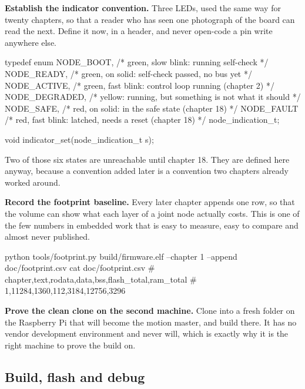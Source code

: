 \begin{steps}
\item \textbf{Establish the indicator convention.} Three LEDs, used the same way
for twenty chapters, so that a reader who has seen one photograph of the board
can read the next. Define it now, in a header, and never open-code a pin write
anywhere else.
\begin{ccode}
typedef enum {
    NODE_BOOT,      /* green, slow blink: running self-check                */
    NODE_READY,     /* green, on solid: self-check passed, no bus yet       */
    NODE_ACTIVE,    /* green, fast blink: control loop running (chapter 2)  */
    NODE_DEGRADED,  /* yellow: running, but something is not what it should */
    NODE_SAFE,      /* red, on solid: in the safe state (chapter 18)        */
    NODE_FAULT      /* red, fast blink: latched, needs a reset (chapter 18) */
} node_indication_t;

void indicator_set(node_indication_t s);
\end{ccode}
Two of those six states are unreachable until chapter 18. They are defined here
anyway, because a convention added later is a convention two chapters already
worked around.

\item \textbf{Record the footprint baseline.} Every later chapter appends one
row, so that the volume can show what each layer of a joint node actually costs.
This is one of the few numbers in embedded work that is easy to measure, easy to
compare and almost never published.
\begin{shellcode}
python tools/footprint.py build/firmware.elf --chapter 1 --append doc/footprint.csv
cat doc/footprint.csv
# chapter,text,rodata,data,bss,flash_total,ram_total
# 1,11284,1360,112,3184,12756,3296
\end{shellcode}

\item \textbf{Prove the clean clone on the second machine.} Clone into a fresh
folder on the Raspberry Pi that will become the motion master, and build there.
It has no vendor development environment and never will, which is exactly why it
is the right machine to prove the build on.
\end{steps}

\subsection*{Build, flash and debug}


